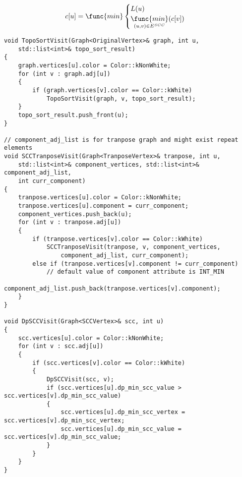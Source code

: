 \begin{equation*}
    c[u] = \func{min}
    \begin{cases}
        L(u) \\
        \mathop{\func{min}}\limits_{(u,v) \in E^{SCC}}(c[v])\\
    \end{cases}
\end{equation*}

\begin{verbatim}
void TopoSortVisit(Graph<OriginalVertex>& graph, int u, 
    std::list<int>& topo_sort_result)
{
    graph.vertices[u].color = Color::kNonWhite;
    for (int v : graph.adj[u])
    {
        if (graph.vertices[v].color == Color::kWhite)
            TopoSortVisit(graph, v, topo_sort_result);
    }
    topo_sort_result.push_front(u);
}

// component_adj_list is for tranpose graph and might exist repeat elements 
void SCCTranposeVisit(Graph<TranposeVertex>& tranpose, int u, 
    std::list<int>& component_vertices, std::list<int>& component_adj_list, 
    int curr_component)
{
    tranpose.vertices[u].color = Color::kNonWhite;
    tranpose.vertices[u].component = curr_component;
    component_vertices.push_back(u);
    for (int v : tranpose.adj[u])
    {
        if (tranpose.vertices[v].color == Color::kWhite)
            SCCTranposeVisit(tranpose, v, component_vertices, 
                component_adj_list, curr_component);
        else if (tranpose.vertices[v].component != curr_component)
            // default value of component attribute is INT_MIN
            component_adj_list.push_back(tranpose.vertices[v].component);
    }
}

void DpSCCVisit(Graph<SCCVertex>& scc, int u)
{
    scc.vertices[u].color = Color::kNonWhite;
    for (int v : scc.adj[u])
    {
        if (scc.vertices[v].color == Color::kWhite)
        {
            DpSCCVisit(scc, v);
            if (scc.vertices[u].dp_min_scc_value > scc.vertices[v].dp_min_scc_value)
            {
                scc.vertices[u].dp_min_scc_vertex = scc.vertices[v].dp_min_scc_vertex;
                scc.vertices[u].dp_min_scc_value = scc.vertices[v].dp_min_scc_value;
            }
        }
    }
}


\end{verbatim}
